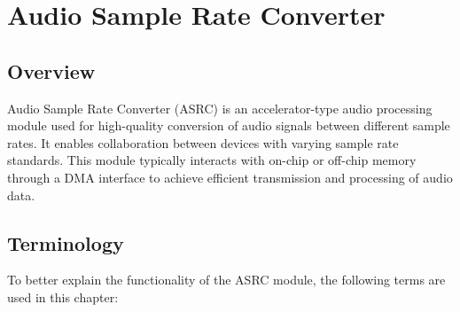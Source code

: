 \documentclass[main\_\_EN.tex]{subfiles}
\begin{document}
\setenglishformatting

\ifglobal
\else
    \listoftodos
    {\let\clearpage\relax \listofdonetodos}
    \tableofcontents
\fi



\hypertarget{asrc}{}
\chapter{Audio Sample Rate Converter}
\label{mod:asrc}



\section{Overview}

Audio Sample Rate Converter (ASRC) is an accelerator-type audio processing module used for high-quality conversion of audio signals between different sample rates. It enables collaboration between devices with varying sample rate standards. This module typically interacts with on-chip or off-chip memory through a DMA interface to achieve efficient transmission and processing of audio data.




\section{Terminology}
\label{sec:asrc-term}

To better explain the functionality of the ASRC module, the following terms are used in this chapter:
\end{document}
